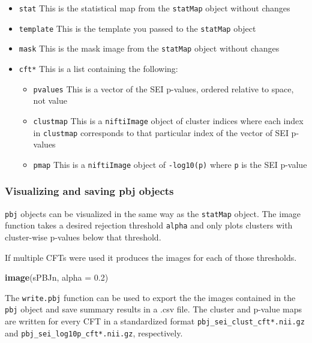 \documentclass[]{article}
\newenvironment{Shaded}{\begin{snugshade}}{\end{snugshade}}
\newcommand{\KeywordTok}[1]{\textcolor[rgb]{0.13,0.29,0.53}{\textbf{#1}}}
\newcommand{\DataTypeTok}[1]{\textcolor[rgb]{0.13,0.29,0.53}{#1}}
\newcommand{\FloatTok}[1]{\textcolor[rgb]{0.00,0.00,0.81}{#1}}
\newcommand{\NormalTok}[1]{#1}
\providecommand{\tightlist}{%
  \setlength{\itemsep}{0pt}\setlength{\parskip}{0pt}}
\begin{document}
\begin{itemize}
\tightlist
\item
  \texttt{stat} This is the statistical map from the \texttt{statMap}
  object without changes
\item
  \texttt{template} This is the template you passed to the
  \texttt{statMap} object
\item
  \texttt{mask} This is the mask image from the \texttt{statMap} object
  without changes
\item
  \texttt{cft*} This is a list containing the following:

  \begin{itemize}
  \tightlist
  \item
    \texttt{pvalues} This is a vector of the SEI p-values, ordered
    relative to space, not value
  \item
    \texttt{clustmap} This is a \texttt{niftiImage} object of cluster
    indices where each index in \texttt{clustmap} corresponds to that
    particular index of the vector of SEI p-values
  \item
    \texttt{pmap} This is a \texttt{niftiImage} object of
    \texttt{-log10(p)} where \texttt{p} is the SEI p-value
  \end{itemize}
\end{itemize}

\subsubsection{Visualizing and saving pbj
objects}\label{visualizing-and-saving-pbj-objects}

\texttt{pbj} objects can be visualized in the same way as the
\texttt{statMap} object. The image function takes a desired rejection
threshold \texttt{alpha} and only plots clusters with cluster-wise
p-values below that threshold.

If multiple CFTs were used it produces the images for each of those
thresholds.

\begin{Shaded}
\begin{Highlighting}[]
\KeywordTok{image}\NormalTok{(sPBJn, }\DataTypeTok{alpha =} \FloatTok{0.2}\NormalTok{)}
\end{Highlighting}
\end{Shaded}

The \texttt{write.pbj} function can be used to export the the images
contained in the \texttt{pbj} object and save summary results in a .csv
file. The cluster and p-value maps are written for every CFT in a
standardized format \texttt{pbj\_sei\_clust\_cft*.nii.gz} and
\texttt{pbj\_sei\_log10p\_cft*.nii.gz}, respectively.
\end{document}
